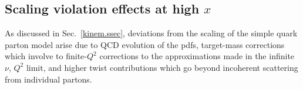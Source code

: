 \subsection{Scaling violation effects at high $x$}\label{hixcor.ssec}


As discussed in Sec.~\ref{kinem.ssec}, deviations from the scaling of the
simple quark parton model arise due to QCD evolution of the pdfs, target-mass
corrections which involve to finite-$Q^2$ corrections to the approximations
made in the infinite $\nu$, $Q^2$ limit, and higher twist contributions which
go beyond incoherent scattering from individual partons.





